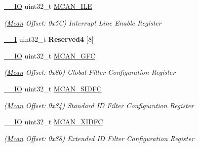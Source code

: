 \begin{DoxyCompactItemize}
\mbox{\label{structMcan_a6335480bc089452f05f3d6fe66b80e0a}} 
\mbox{\hyperlink{core__cm7_8h_aec43007d9998a0a0e01faede4133d6be}{\+\_\+\+\_\+\+IO}} uint32\+\_\+t \mbox{\hyperlink{structMcan_a6335480bc089452f05f3d6fe66b80e0a}{M\+C\+A\+N\+\_\+\+I\+LE}}
\begin{DoxyCompactList}\small\item\em (\mbox{\hyperlink{structMcan}{Mcan}} Offset\+: 0x5C) Interrupt Line Enable Register \end{DoxyCompactList}\item 
\mbox{\label{structMcan_a0a01f71cb9e82fa38d288f16a1d0ef11}} 
\mbox{\hyperlink{core__cm7_8h_af63697ed9952cc71e1225efe205f6cd3}{\+\_\+\+\_\+I}} uint32\+\_\+t {\bfseries Reserved4} \mbox{[}8\mbox{]}
\item 
\mbox{\label{structMcan_aad79e393b3efaf72d50e36ab74f23e48}} 
\mbox{\hyperlink{core__cm7_8h_aec43007d9998a0a0e01faede4133d6be}{\+\_\+\+\_\+\+IO}} uint32\+\_\+t \mbox{\hyperlink{structMcan_aad79e393b3efaf72d50e36ab74f23e48}{M\+C\+A\+N\+\_\+\+G\+FC}}
\begin{DoxyCompactList}\small\item\em (\mbox{\hyperlink{structMcan}{Mcan}} Offset\+: 0x80) Global Filter Configuration Register \end{DoxyCompactList}\item 
\mbox{\label{structMcan_a32e36aedb4c5461ca369c4fdd1033109}} 
\mbox{\hyperlink{core__cm7_8h_aec43007d9998a0a0e01faede4133d6be}{\+\_\+\+\_\+\+IO}} uint32\+\_\+t \mbox{\hyperlink{structMcan_a32e36aedb4c5461ca369c4fdd1033109}{M\+C\+A\+N\+\_\+\+S\+I\+D\+FC}}
\begin{DoxyCompactList}\small\item\em (\mbox{\hyperlink{structMcan}{Mcan}} Offset\+: 0x84) Standard ID Filter Configuration Register \end{DoxyCompactList}\item 
\mbox{\label{structMcan_ac2b66335790ea786a68039e1a503b1c9}} 
\mbox{\hyperlink{core__cm7_8h_aec43007d9998a0a0e01faede4133d6be}{\+\_\+\+\_\+\+IO}} uint32\+\_\+t \mbox{\hyperlink{structMcan_ac2b66335790ea786a68039e1a503b1c9}{M\+C\+A\+N\+\_\+\+X\+I\+D\+FC}}
\begin{DoxyCompactList}\small\item\em (\mbox{\hyperlink{structMcan}{Mcan}} Offset\+: 0x88) Extended ID Filter Configuration Register \end{DoxyCompactList}\item 

\end{DoxyCompactItemize}
